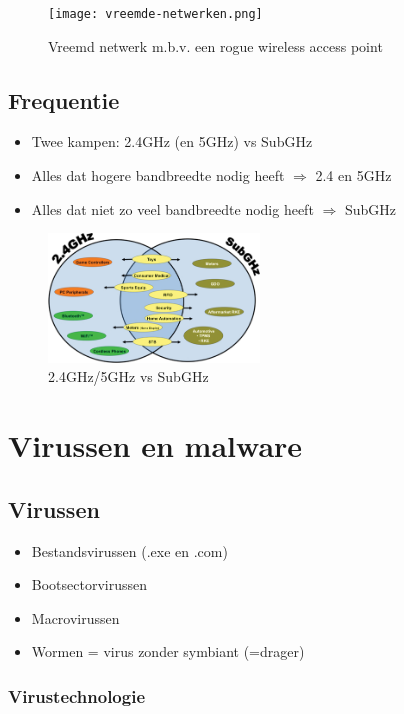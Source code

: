\documentclass{article}
\begin{document}
\begin{figure}[H]
    \centering
    \texttt{[image: vreemde-netwerken.png]}
    \caption{Vreemd netwerk m.b.v. een rogue wireless access point}
\end{figure}

\subsection{Frequentie}

\begin{itemize}
    \item Twee kampen: 2.4GHz (en 5GHz) vs SubGHz
    \item Alles dat hogere bandbreedte nodig heeft $\Rightarrow$ 2.4 en 5GHz
    \item Alles dat niet zo veel bandbreedte nodig heeft $\Rightarrow$ SubGHz
\end{itemize}


\begin{figure}[H]
    \centering
    \includegraphics[width=0.5\textwidth]{2.4-subghz.png}
    \caption{2.4GHz/5GHz vs SubGHz}
\end{figure}


\section{Virussen en malware}

\subsection{Virussen}

\begin{itemize}
    \item Bestandsvirussen (.exe en .com)
    \item Bootsectorvirussen
    \item Macrovirussen
    \item Wormen = virus zonder symbiant (=drager)
\end{itemize}

\subsubsection{Virustechnologie}
\end{document}
